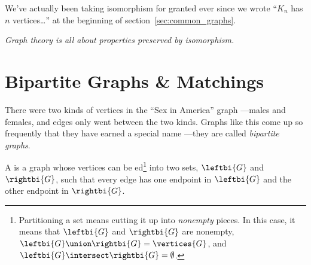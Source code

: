 We've actually been taking isomorphism for granted ever since we wrote
``$K_n$ has $n$ vertices\dots'' at the beginning of
section~\ref{sec:common_graphs}.  

\iffalse
A pickier sentence is ``Any graph isomorphic to some graph
that is a $K_n$ has $n$ vertices\dots.''  But since having $n$
vertices is a property preserved by isomorphism, the picky version is
unnecessary if not silly.
\fi

\emph{Graph theory is all about properties preserved by isomorphism.}

\begin{problems}
\classproblems
{}

\homeworkproblems
{}

\examproblems
{}
\end{problems}


\section{Bipartite Graphs \& Matchings}\label{bipartitesec}


There were two kinds of vertices in the ``Sex in America'' graph
---males and females, and edges only went between the two kinds.
Graphs like this come up so frequently that they have earned a special
name ---they are called \emph{bipartite graphs}.

\begin{definition}
  A   is a graph whose vertices can be
  ed\footnote{Partitioning a set means cutting it up into
    \emph{nonempty} pieces.  In this case, it means that $\leftbi{G}$ and
    $\rightbi{G}$ are nonempty, $\leftbi{G} \union \rightbi{G} =
    \vertices{G}$, and $\leftbi{G} \intersect \rightbi{G} =
    \emptyset$.} into two sets, $\leftbi{G}$ and
    $\rightbi{G}$, such that every edge has one endpoint in
    $\leftbi{G}$ and the other endpoint in $\rightbi{G}$.
\end{definition}

